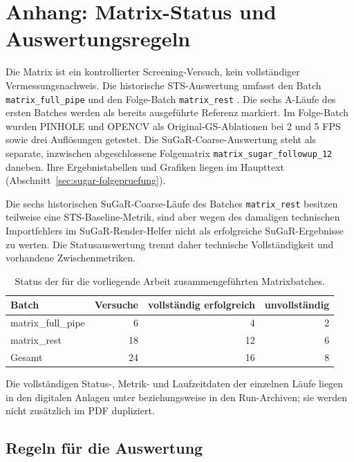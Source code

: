 \section{Anhang: Matrix-Status und Auswertungsregeln}

Die Matrix ist ein kontrollierter Screening-Versuch, kein vollständiger
Vermessungsnachweis. Die historische STS-Auswertung umfasst den Batch
\texttt{matrix\_full\_pipe} und den Folge-Batch \texttt{matrix\_rest}
\parencite{matrixRestResults}. Die sechs A-Läufe des ersten Batches werden als
bereits ausgeführte Referenz markiert. Im Folge-Batch wurden PINHOLE und
OPENCV als Original-GS-Ablationen bei 2 und 5 FPS sowie drei Auflösungen
getestet. Die SuGaR-Coarse-Auswertung steht als separate, inzwischen
abgeschlossene Folgematrix \texttt{matrix\_sugar\_followup\_12} daneben. Ihre
Ergebnistabellen und Grafiken liegen im Haupttext
(Abschnitt~\ref{sec:sugar-folgepruefung}).

Die sechs historischen SuGaR-Coarse-Läufe des Batches
\texttt{matrix\_rest} besitzen teilweise eine STS-Baseline-Metrik, sind aber
wegen des damaligen technischen Importfehlers im SuGaR-Render-Helfer nicht als
erfolgreiche SuGaR-Ergebnisse zu werten. Die Statusauswertung trennt daher
technische Vollständigkeit und vorhandene Zwischenmetriken.

\begin{table}[H]
\centering
\small
\begin{tabular}{lrrr}
\toprule
Batch & Versuche & vollständig erfolgreich & unvollständig\\
\midrule
matrix\_full\_pipe & 6 & 4 & 2\\
matrix\_rest & 18 & 12 & 6\\
Gesamt & 24 & 16 & 8\\
\bottomrule
\end{tabular}
\caption{Status der für die vorliegende Arbeit zusammengeführten Matrixbatches.}
\label{tab:matrix-status}
\end{table}

Die vollständigen Status-, Metrik- und Laufzeitdaten der einzelnen Läufe
liegen in den digitalen Anlagen unter
beziehungsweise in den Run-Archiven; sie werden nicht zusätzlich im PDF
dupliziert.

\subsection*{Regeln für die Auswertung}

